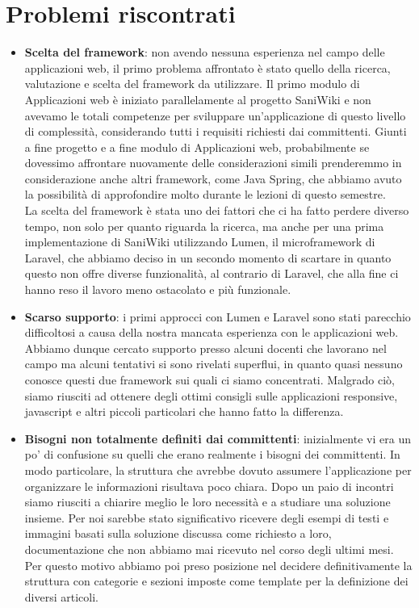 \documentclass[twoside]{supsistudent}
\begin{document}
\section{Problemi riscontrati}
\begin{itemize}
\item \textbf{Scelta del framework}: non avendo nessuna esperienza nel campo delle applicazioni web, il primo problema affrontato è stato quello della ricerca, valutazione e scelta del framework da utilizzare. Il primo modulo di Applicazioni web è iniziato parallelamente al progetto SaniWiki e non avevamo le totali competenze per sviluppare un'applicazione di questo livello di complessità, considerando tutti i requisiti richiesti dai committenti. Giunti a fine progetto e a fine modulo di Applicazioni web, probabilmente se dovessimo affrontare nuovamente delle considerazioni simili prenderemmo in considerazione anche altri framework, come Java Spring, che abbiamo avuto la possibilità di approfondire molto durante le lezioni di questo semestre.\\
La scelta del framework è stata uno dei fattori che ci ha fatto perdere diverso tempo, non solo per quanto riguarda la ricerca, ma anche per una prima implementazione di SaniWiki utilizzando Lumen, il microframework di Laravel, che abbiamo deciso in un secondo momento di scartare in quanto questo non offre diverse funzionalità, al contrario di Laravel, che alla fine ci hanno reso il lavoro meno ostacolato e più funzionale.
\item \textbf{Scarso supporto}: i primi approcci con Lumen e Laravel sono stati parecchio difficoltosi a causa della nostra mancata esperienza con le applicazioni web. Abbiamo dunque cercato supporto presso alcuni docenti che lavorano nel campo ma alcuni tentativi si sono rivelati superflui, in quanto quasi nessuno conosce questi due framework sui quali ci siamo concentrati. Malgrado ciò, siamo riusciti ad ottenere degli ottimi consigli sulle applicazioni responsive, javascript e altri piccoli particolari che hanno fatto la differenza.
\item \textbf{Bisogni non totalmente definiti dai committenti}: inizialmente vi era un po' di confusione su quelli che erano realmente i bisogni dei committenti. In modo particolare, la struttura che avrebbe dovuto assumere l'applicazione per organizzare le informazioni risultava poco chiara. Dopo un paio di incontri siamo riusciti a chiarire meglio le loro necessità e a studiare una soluzione insieme. Per noi sarebbe stato significativo ricevere degli esempi di testi e immagini basati sulla soluzione discussa come richiesto a loro, documentazione che non abbiamo mai ricevuto nel corso degli ultimi mesi. Per questo motivo abbiamo poi preso posizione nel decidere definitivamente la struttura con categorie e sezioni imposte come template per la definizione dei diversi articoli.

\end{itemize}
\end{document}
